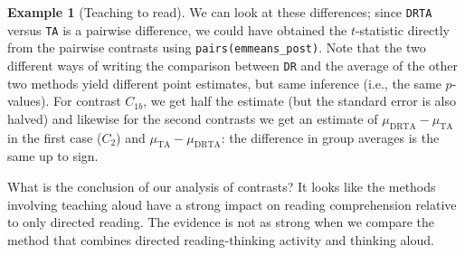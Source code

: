 \documentclass[
  11pt,
  letterpaper,
]{scrbook}
\theoremstyle{definition}
\newtheorem{example}{Example}[chapter]
\theoremstyle{remark}
\begin{document}
\begin{example}[Teaching to
read]
We can look at these differences; since \texttt{DRTA} versus \texttt{TA}
is a pairwise difference, we could have obtained the \(t\)-statistic
directly from the pairwise contrasts using
\texttt{pairs(emmeans\_post)}. Note that the two different ways of
writing the comparison between \texttt{DR} and the average of the other
two methods yield different point estimates, but same inference (i.e.,
the same \(p\)-values). For contrast \(C_{1b}\), we get half the
estimate (but the standard error is also halved) and likewise for the
second contrasts we get an estimate of
\(\mu_{\mathrm{DRTA}} - \mu_{\mathrm{TA}}\) in the first case (\(C_2\))
and \(\mu_{\mathrm{TA}} - \mu_{\mathrm{DRTA}}\): the difference in group
averages is the same up to sign.

What is the conclusion of our analysis of contrasts? It looks like the
methods involving teaching aloud have a strong impact on reading
comprehension relative to only directed reading. The evidence is not as
strong when we compare the method that combines directed
reading-thinking activity and thinking aloud.

\end{example}
\end{document}
